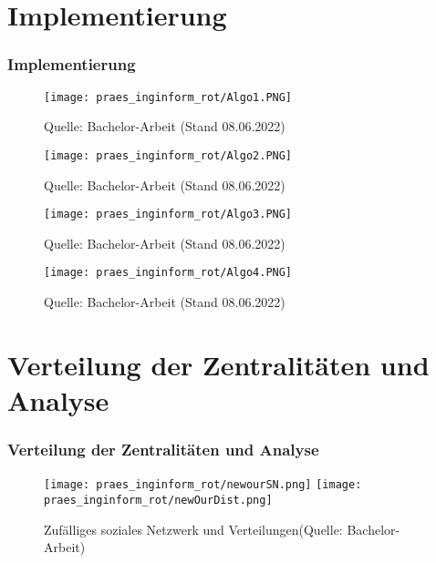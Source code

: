 \documentclass[notes=show]{beamer}
\begin{document}
\section{Implementierung}
\begin{frame}
  \frametitle{Implementierung}
\vspace{-2.6cm}
\vspace{2.0cm}
  \begin{figure}
  \centering
    \texttt{[image: praes\_inginform\_rot/Algo1.PNG]}
    \caption{\tiny{Quelle: Bachelor-Arbeit (Stand 08.06.2022)}}
    \label{fig:my_label}
\end{figure}
\end{frame}

\begin{frame}
\vspace{-2.6cm}
\vspace{2.0cm}
  \begin{figure}
  \centering
    \texttt{[image: praes\_inginform\_rot/Algo2.PNG]}
    \caption{\tiny{Quelle: Bachelor-Arbeit (Stand 08.06.2022)}}
    \label{fig:my_label}
\end{figure}
\end{frame}

\begin{frame}
\vspace{-2.6cm}
\vspace{2.0cm}
  \begin{figure}
  \centering
    \texttt{[image: praes\_inginform\_rot/Algo3.PNG]}
    \caption{\tiny{Quelle: Bachelor-Arbeit (Stand 08.06.2022)}}
    \label{fig:my_label}
\end{figure}
\end{frame}

\begin{frame}
\vspace{-2.6cm}
\vspace{2.0cm}
  \begin{figure}
  \centering
    \texttt{[image: praes\_inginform\_rot/Algo4.PNG]}
    \caption{\tiny{Quelle: Bachelor-Arbeit (Stand 08.06.2022)}}
    \label{fig:my_label}
\end{figure}
\end{frame}


\section{Verteilung der Zentralitäten und Analyse}
\begin{frame}
  \frametitle{Verteilung der Zentralitäten und Analyse}
  \begin{figure}
  \centering
  \texttt{[image: praes\_inginform\_rot/newourSN.png]}
  \texttt{[image: praes\_inginform\_rot/newOurDist.png]}
  \caption{Zufälliges soziales Netzwerk und Verteilungen(Quelle: Bachelor-Arbeit)}
  \label{fig:distributionALL}
\end{figure}
  

\end{frame}
\end{document}
